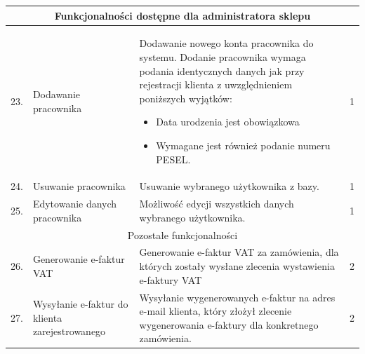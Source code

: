 \documentclass[10pt,a4paper]{article}
\begin{document}
\begin{longtable}{| m{0.5cm} | m{4cm} | p{6cm} | m{1.5cm} |}
			\multicolumn{4}{|c|}{Funkcjonalności dostępne dla administratora sklepu}\\ \hline
			23.&Dodawanie pracownika				   & Dodawanie nowego konta pracownika do systemu.
														 Dodanie pracownika wymaga podania identycznych
														 danych jak przy rejestracji klienta
														 z uwzględnieniem poniższych wyjątków:
														 \begin{itemize}[label={--}]
														 \item Data urodzenia jest obowiązkowa
														 \item Wymagane jest również podanie numeru PESEL.  
														 \end{itemize}									& 1\\ \hline
			24.&Usuwanie pracownika					   & Usuwanie wybranego użytkownika z bazy.			& 1\\ \hline
			25.&Edytowanie danych pracownika		   & Możliwość edycji wszystkich danych 
														 wybranego użytkownika.							& 1\\ \hline
     		\multicolumn{4}{|c|}{Pozostałe funkcjonalności}\\ \hline
			26.&Generowanie e-faktur VAT			   & Generowanie e-faktur VAT za zamówienia,
														 dla których zostały wysłane zlecenia 
														 wystawienia e-faktury VAT						& 2\\ \hline
			27.&Wysyłanie e-faktur do klienta
			    zarejestrowanego					   & Wysyłanie wygenerowanych e-faktur na 
			    										 adres e-mail klienta, który złożył 
			    										 zlecenie wygenerowania e-faktury 
			    										 dla konkretnego zamówienia.					& 2\\ \hline


     \end{longtable}
     
     \newpage
\end{document}
